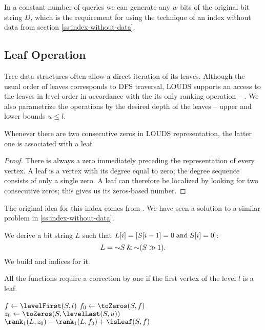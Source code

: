 In a constant number of queries we can generate any $w$ bits of the original bit string $D$, which is the requirement for using the technique of an index without data from section \ref{ss:index-without-data}.

\subsection{\label{ss:leaf-queries}Leaf Operation}

Tree data structures often allow a direct iteration of its leaves.
Although the usual order of leaves corresponds to DFS traversal, LOUDS supports an access to the leaves in level-order in accordance with the its only ranking operation -- \loRank{}.
We also parametrize the operations by the desired depth of the leaves -- upper and lower bounds $u \le l$.

\begin{lemma}
	Whenever there are two consecutive zeros in LOUDS representation, the latter one is associated with a leaf.
\end{lemma}
\begin{proof}
	There is always a zero immediately preceding the representation of every vertex.
	A leaf is a vertex with its degree equal to zero; the degree sequence consists of only a single zero.
	A leaf can therefore be localized by looking for two consecutive zeros; this gives us its zeros-based number.
\end{proof}

The original idea for this index comes from \cite{munro1998space}.
We have seen a solution to a similar problem in \ref{ss:index-without-data}.

We derive a bit string $L$ such that $L[i] = [S[i - 1] = 0 \mathrel{\textrm{and}} S[i] = 0]$:
$$ L = \mathord{\sim} S \mathbin{\&} \mathord{\sim} (S \mathbin{\gg} 1). $$
We build \rank{} and \select{} indices for it.

All the functions require a correction by one if the first vertex of the level $l$ is a leaf.

\begin{algorithm}
\begin{algorithmic}
	\State $f \gets \levelFirst(S, l)$ 
	\State $f_0 \gets \toZeros(S, f)$
	\State $z_0 \gets \toZeros(S, \levelLast(S, u))$
	\State \Return $\rank_1(L, z_0) - \rank_1(L, f_0) + \isLeaf(S, f)$
\EndFunction
\end{algorithmic}
\end{algorithm}


